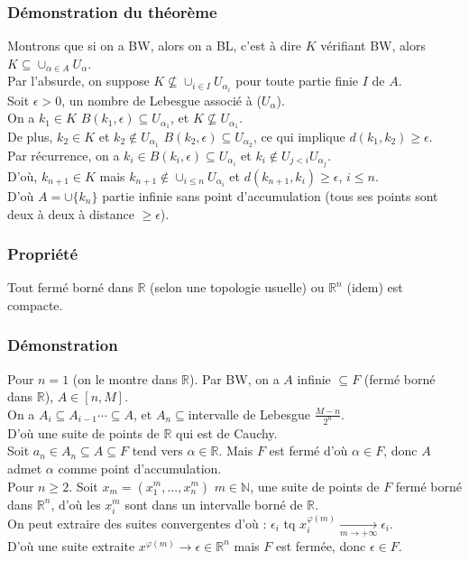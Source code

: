 \documentclass[a4paper, oneside]{report}
\newcommand{\R}{\mathbb{R}}
\newcommand{\N}{\mathbb{N}}
\newcommand{\dem}{\subsubsection{Démonstration}}
\newcommand{\propr}{\subsubsection{Propriété}}
\begin{document}
\subsubsection{Démonstration du théorème}

Montrons que si on a BW, alors on a BL, c'est à dire $K$ vérifiant BW, alors $K\subseteq \cup_{\alpha \in A} U_\alpha$.\\
Par l'absurde, on suppose $K \nsubseteq \cup_{i\in I} U_{\alpha_i}$ pour toute partie finie $I$ de $A$.\\
Soit $\epsilon >0$, un nombre de Lebesgue associé à ($U_\alpha$).\\
On a $k_1\in K$ $B(k_1,\epsilon) \subseteq U_{\alpha_1}$, et $K\nsubseteq U_{\alpha_1}$.\\
De plus, $k_2\in K$ et $k_2\notin U_{\alpha_1}$ $B(k_2,\epsilon) \subseteq U_{\alpha_2}$, ce qui implique $d(k_1,k_2)\geq \epsilon$.\\
Par récurrence, on a $k_i\in B(k_i,\epsilon)\subseteq U_{\alpha_i}$ et $k_i\notin U_{j<i}U_{\alpha_j}$.\\
D'où, $k_{n+1}\in K$ mais $k_{n+1}\notin \cup_{i\leq n}U_{\alpha_i}$ et $d(k_{n+1}, k_i)\geq \epsilon$, $i\leq n$.\\
D'où $A=\cup \{k_n\}$ partie infinie sans point d'accumulation (tous ses points sont deux à deux à distance $\geq \epsilon$).

\propr
Tout fermé borné dans $\R$ (selon une topologie usuelle) ou $\R^n$ (idem) est compacte.

\dem
Pour $n=1$ (on le montre dans $\R$). Par BW, on a $A$ infinie $\subseteq F$ (fermé borné dans $\R$), $A\in [n,M]$.\\
On a $A_i\subseteq A_{i-1}\cdots \subseteq A$, et $A_n \subseteq $intervalle de Lebesgue $\frac{M-n}{2^n}$.\\
D'où une suite de points de $\R$ qui est de Cauchy.\\
Soit $a_n\in A_n\subseteq A \subseteq F$ tend vers $\alpha \in \R$. Mais $F$ est fermé d'où $\alpha \in F$, donc $A$ admet $\alpha$ comme point d'accumulation.\\
 
Pour $n\geq 2$. Soit $x_m = (x_1^m,...,x_n^m)$ $m\in \N$, une suite de points de $F$ fermé borné dans $\R^n$, d'où les $x_i^m$ sont dans un intervalle borné de $\R$.\\
On peut extraire des suites convergentes d'où : $\epsilon_i$ tq $x_i^{\varphi(m)}\underset{m \rightarrow +\infty}{\rightarrow }\epsilon_i$.\\
D'où une suite extraite $x^{\varphi(m)}\rightarrow \epsilon \in \R^n$ mais $F$ est fermée, donc $\epsilon \in F$.
\end{document}

